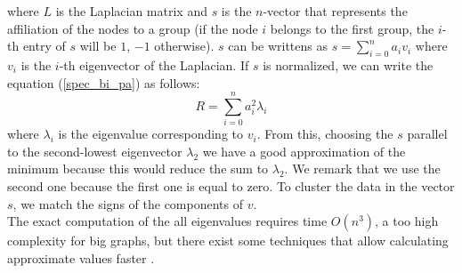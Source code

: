 where $L$ is the Laplacian matrix and $s$ is the $n$-vector that represents the affiliation of the nodes to a group (if the node $i$ belongs to the first group, the $i$-th entry of $s$ will be $1$, $-1$ otherwise).
$s$ can be writtens as $s= \sum_{i=0}^n a_i v_i$ where $v_i$ is the $i$-th eigenvector of the Laplacian.
If $s$ is normalized, we can write the equation (\ref{spec_bi_pa}) as follows:
\begin{equation}\label{spec_bi_pa}
R = \sum_{i=0}^n a_i^2 \lambda_i
\end{equation} 
where $\lambda_i$ is the eigenvalue corresponding to $v_i$.
From this, choosing the $s$ parallel to the second-lowest eigenvector $\lambda_2$ we have a good approximation of the minimum because this would reduce the sum to $\lambda_2$. We remark that we use the second one because the first one is equal to zero. To cluster the data in the vector $s$, we match the signs of the components of $v$. \\
The exact computation of the all eigenvalues requires time $O(n^3)$, a too high complexity for big graphs, but there exist some techniques that allow calculating approximate values faster \cite{fortunato}.
 
